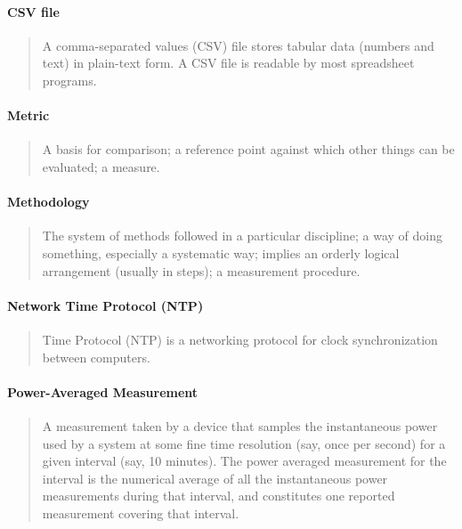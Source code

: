 \setlength{\parskip}{1pt}
\paragraph*{CSV file}
\begin{quote}
A comma-separated values (CSV) file stores tabular data (numbers and text) in plain-text form. A CSV file is readable by most spreadsheet programs.
\end{quote}

\paragraph*{Metric}
\begin{quote}
A basis for comparison; a reference point against which other things can be evaluated; a measure.
\end{quote}

\paragraph*{Methodology}
\begin{quote}
The system of methods followed in a particular discipline; a way of doing something, especially a systematic way; implies an orderly logical arrangement (usually in steps); a measurement procedure.
\end{quote}


\paragraph*{Network Time Protocol (NTP)}
\begin{quote}
Time Protocol (NTP) is a networking protocol for clock synchronization between computers.
\end{quote}

\paragraph*{Power-Averaged Measurement}
\begin{quote}
A measurement taken by a device that samples the instantaneous power used by a system at some fine
time resolution (say, once per second) for a given interval (say, 10 minutes).  The power averaged
measurement for the interval is the numerical average of all the instantaneous power measurements
during that interval, and constitutes one reported measurement covering that interval.
\end{quote}

